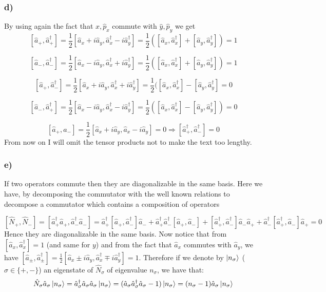 \documentclass[10pt,a4paper]{book}
\begin{document}
\subsubsection{d)}
By using again the fact that $\hat{x},\hat{p}_x$ commute with $\hat{y},\hat{p}_y$ we get 
$$[\hat{a}_+,\hat{a}_+^{\dagger}]=\frac{1}{2}[\hat{a}_x+i\hat{a}_y,\hat{a}_x^{\dagger}-i\hat{a}^{\dagger}_y]=\frac{1}{2}([\hat{a}_x,\hat{a}_x^{\dagger}]+[\hat{a}_y,\hat{a}_y^{\dagger}])=1$$

$$[\hat{a}_-,\hat{a}_-^{\dagger}]=\frac{1}{2}[\hat{a}_x-i\hat{a}_y,\hat{a}_x^{\dagger}+i\hat{a}^{\dagger}_y]=\frac{1}{2}([\hat{a}_x,\hat{a}_x^{\dagger}]+[\hat{a}_y,\hat{a}_y^{\dagger}])=1$$


$$[\hat{a}_+,\hat{a}_-^{\dagger}]=\frac{1}{2}[\hat{a}_x+i\hat{a}_y,\hat{a}_x^{\dagger}+i\hat{a}^{\dagger}_y]=\frac{1}{2}([\hat{a}_x,\hat{a}_x^{\dagger}]-[\hat{a}_y,\hat{a}_y^{\dagger}]=0$$

$$[\hat{a}_-,\hat{a}_+^{\dagger}]=\frac{1}{2}[\hat{a}_x-i\hat{a}_y,\hat{a}_x^{\dagger}-i\hat{a}^{\dagger}_y]=\frac{1}{2}([\hat{a}_x,\hat{a}_x^{\dagger}]-[\hat{a}_y,\hat{a}_y^{\dagger}])=0$$

$$[\hat{a}_+,\hat{a}_-]=\frac{1}{2}[\hat{a}_x+i\hat{a}_y,\hat{a}_x-i\hat{a}_y]=0\Rightarrow [\hat{a}_+^{\dagger},\hat{a}_-^{\dagger}]=0$$
From now on I will omit the tensor products not to make the text too lengthy.

\subsubsection*{e)}
If two operators commute then they are diagonalizable in the same basis. Here we have, by decomposing the commutator with the well known relations to decompose a commutator which contains a  composition of operators

$$[\hat{N}_{+},\hat{N}_-]=[\hat{a}_+^{\dagger}\hat{a}_+,\hat{a}_-^{\dagger}\hat{a}_-]=\hat{a}_+^{\dagger}[\hat{a}_+,\hat{a}_-^{\dagger}]\hat{a}_-+
\hat{a}_+^{\dagger}\hat{a}_-^{\dagger}[\hat{a}_+,\hat{a}_-]+[\hat{a}_+^{\dagger},\hat{a}_-^{\dagger}]\hat{a}_-\hat{a}_++\hat{a}_-^{\dagger}[\hat{a}_+^{\dagger},\hat{a}_-]\hat{a}_+=0
$$
Hence they are diagonalizable in the same basis.
Now notice that from $[\hat{a}_x,\hat{a}_x^{\dagger}]=1$ (and same for $y$) and from the fact that $\hat{a}_x$ commutes with $\hat{a}_y$, we have $[\hat{a}_{\pm},\hat{a}_{\pm}^{\dagger}]=\frac{1}{2}[\hat{a}_x\pm i\hat{a}_y,\hat{a}_x^{\dagger}\mp i\hat{a}_y^{\dagger}]=1$.
Therefore if we denote by $\ket{n_{\sigma}}$ ($\sigma\in\{+,-\}$) an eigenstate of $\hat{N}_{\sigma}$ of eigenvalue $n_{\sigma}$, we have that:
$$\hat{N}_{\sigma}\hat{a}_{\sigma}\ket{n_{\sigma}}=\hat{a}_{\sigma}^{\dagger}\hat{a}_{\sigma}\hat{a}_{\sigma}\ket{n_{\sigma}}=(\hat{a}_{\sigma}\hat{a}_{\sigma}^{\dagger}\hat{a}_{\sigma}-1)\ket{n_{\sigma}}=(n_{\sigma}-1)\hat{a}_{\sigma}\ket{n_{\sigma}}$$
\end{document}
